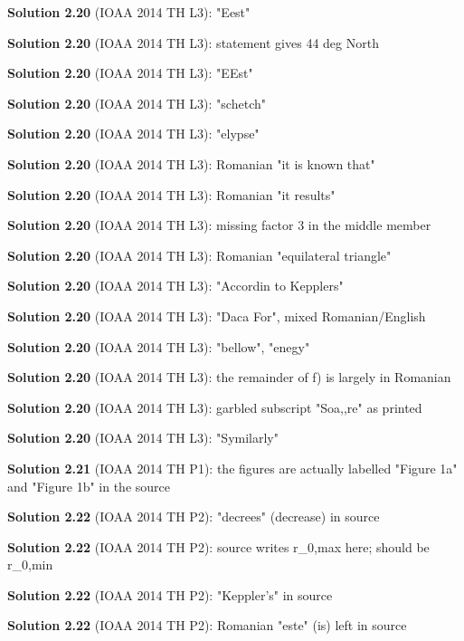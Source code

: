 \noindent\textbf{Solution 2.20} (IOAA 2014 TH L3): "Eest"
\smallskip

\noindent\textbf{Solution 2.20} (IOAA 2014 TH L3): statement gives 44 deg North
\smallskip

\noindent\textbf{Solution 2.20} (IOAA 2014 TH L3): "EEst"
\smallskip

\noindent\textbf{Solution 2.20} (IOAA 2014 TH L3): "schetch"
\smallskip

\noindent\textbf{Solution 2.20} (IOAA 2014 TH L3): "elypse"
\smallskip

\noindent\textbf{Solution 2.20} (IOAA 2014 TH L3): Romanian "it is known that"
\smallskip

\noindent\textbf{Solution 2.20} (IOAA 2014 TH L3): Romanian "it results"
\smallskip

\noindent\textbf{Solution 2.20} (IOAA 2014 TH L3): missing factor 3 in the middle member
\smallskip

\noindent\textbf{Solution 2.20} (IOAA 2014 TH L3): Romanian "equilateral triangle"
\smallskip

\noindent\textbf{Solution 2.20} (IOAA 2014 TH L3): "Accordin to Kepplers"
\smallskip

\noindent\textbf{Solution 2.20} (IOAA 2014 TH L3): "Daca For", mixed Romanian/English
\smallskip

\noindent\textbf{Solution 2.20} (IOAA 2014 TH L3): "bellow", "enegy"
\smallskip

\noindent\textbf{Solution 2.20} (IOAA 2014 TH L3): the remainder of f) is largely in Romanian
\smallskip

\noindent\textbf{Solution 2.20} (IOAA 2014 TH L3): garbled subscript "Soa,,re" as printed
\smallskip

\noindent\textbf{Solution 2.20} (IOAA 2014 TH L3): "Symilarly"
\smallskip

\noindent\textbf{Solution 2.21} (IOAA 2014 TH P1): the figures are actually labelled "Figure 1a" and "Figure 1b" in the source
\smallskip

\noindent\textbf{Solution 2.22} (IOAA 2014 TH P2): "decrees" (decrease) in source
\smallskip

\noindent\textbf{Solution 2.22} (IOAA 2014 TH P2): source writes r\_{0,max} here; should be r\_{0,min}
\smallskip

\noindent\textbf{Solution 2.22} (IOAA 2014 TH P2): "Keppler's" in source
\smallskip

\noindent\textbf{Solution 2.22} (IOAA 2014 TH P2): Romanian "este" (is) left in source
\smallskip

